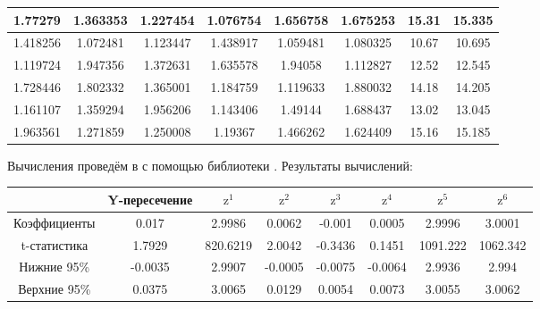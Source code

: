 \begin{center}
\begin{tabular}{ | c | c | c | c | c | c | c | c | }
      \hline 
      1.77279 & 1.363353 & 1.227454 & 1.076754 & 1.656758 & 1.675253 & 15.31 & 15.335 \\ 
      \hline 
      1.418256 & 1.072481 & 1.123447 & 1.438917 & 1.059481 & 1.080325 & 10.67 & 10.695 \\ 
      \hline 
      1.119724 & 1.947356 & 1.372631 & 1.635578 & 1.94058 & 1.112827 & 12.52 & 12.545 \\ 
      \hline 
      1.728446 & 1.802332 & 1.365001 & 1.184759 & 1.119633 & 1.880032 & 14.18 & 14.205 \\ 
      \hline 
      1.161107 & 1.359294 & 1.956206 & 1.143406 & 1.49144 & 1.688437 & 13.02 & 13.045 \\ 
      \hline 
      1.963561 & 1.271859 & 1.250008 & 1.19367 & 1.466262 & 1.624409 & 15.16 & 15.185 \\ 
      \hline 
    \end{tabular}
\end{center}

Вычисления проведём в  с помощью библиотеки .
Результаты вычислений:

\renewcommand{\arraystretch}{0.65}
\begin{center}
    \begin{tabular}{ | c | c | c | c | c | c | c | c | } 
      \hline
       & Y-пересечение & $\textrm{z}^1$ & $\textrm{z}^2$ & $\textrm{z}^3$ & $\textrm{z}^4$ & $\textrm{z}^5$ & $\textrm{z}^6$ \\
      \hline
      Коэффициенты & 0.017 & 2.9986 & 0.0062 & -0.001 & 0.0005 & 2.9996 & 3.0001 \\ 
      \hline 
     t-статистика & 1.7929 & 820.6219 & 2.0042 & -0.3436 & 0.1451 & 1091.222 & 1062.342 \\ 
      \hline 
     Нижние 95\% & -0.0035 & 2.9907 & -0.0005 & -0.0075 & -0.0064 & 2.9936 & 2.994 \\ 
      \hline 
     Верхние 95\% & 0.0375 & 3.0065 & 0.0129 & 0.0054 & 0.0073 & 3.0055 & 3.0062 \\ 
      \hline 
    \end{tabular}
\end{center}

